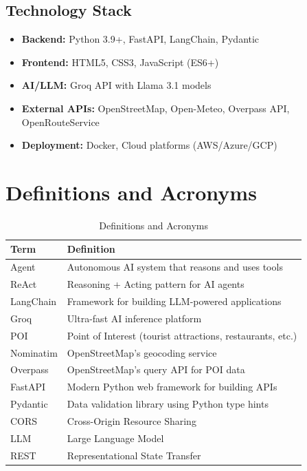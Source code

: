 \documentclass[12pt,a4paper]{report}
\begin{document}
\subsection{Technology Stack}

\begin{itemize}
    \item \textbf{Backend:} Python 3.9+, FastAPI, LangChain, Pydantic
    \item \textbf{Frontend:} HTML5, CSS3, JavaScript (ES6+)
    \item \textbf{AI/LLM:} Groq API with Llama 3.1 models
    \item \textbf{External APIs:} OpenStreetMap, Open-Meteo, Overpass API, OpenRouteService
    \item \textbf{Deployment:} Docker, Cloud platforms (AWS/Azure/GCP)
\end{itemize}

\section{Definitions and Acronyms}

\begin{table}[H]
\centering
\begin{tabular}{|p{3cm}|p{11cm}|}
\hline
\textbf{Term} & \textbf{Definition} \\
\hline
Agent & Autonomous AI system that reasons and uses tools \\
\hline
ReAct & Reasoning + Acting pattern for AI agents \\
\hline
LangChain & Framework for building LLM-powered applications \\
\hline
Groq & Ultra-fast AI inference platform \\
\hline
POI & Point of Interest (tourist attractions, restaurants, etc.) \\
\hline
Nominatim & OpenStreetMap's geocoding service \\
\hline
Overpass & OpenStreetMap's query API for POI data \\
\hline
FastAPI & Modern Python web framework for building APIs \\
\hline
Pydantic & Data validation library using Python type hints \\
\hline
CORS & Cross-Origin Resource Sharing \\
\hline
LLM & Large Language Model \\
\hline
REST & Representational State Transfer \\
\hline
\end{tabular}
\caption{Definitions and Acronyms}
\label{tab:definitions}
\end{table}
\end{document}
